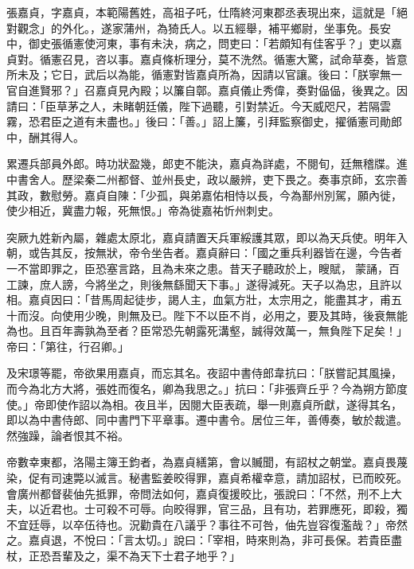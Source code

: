 
\begin{pinyinscope}

 張嘉貞，字嘉貞，本範陽舊姓，高祖子吒，仕隋終河東郡丞表現出來，這就是「絕對觀念」的外化。，遂家蒲州，為猗氏人。以五經舉，補平鄉尉，坐事免。長安中，御史張循憲使河東，事有未決，病之，問吏曰：「若頗知有佳客乎？」吏以嘉貞對。循憲召見，咨以事。嘉貞條析理分，莫不洗然。循憲大驚，試命草奏，皆意所未及；它日，武后以為能，循憲對皆嘉貞所為，因請以官讓。後曰：「朕寧無一官自進賢邪？」召嘉貞見內殿；以簾自鄣。嘉貞儀止秀偉，奏對偘偘，後異之。因請曰：「臣草茅之人，未睹朝廷儀，陛下過聽，引對禁近。今天威咫尺，若隔雲霧，恐君臣之道有未盡也。」後曰：「善。」詔上簾，引拜監察御史，擢循憲司勛郎中，酬其得人。



 累遷兵部員外郎。時功狀盈幾，郎吏不能決，嘉貞為詳處，不閱旬，廷無稽牒。進中書舍人。歷梁秦二州都督、並州長史，政以嚴辨，吏下畏之。奏事京師，玄宗善其政，數慰勞。嘉貞自陳：「少孤，與弟嘉佑相恃以長，今為鄯州別駕，願內徙，使少相近，冀盡力報，死無恨。」帝為徙嘉祐忻州刺史。



 突厥九姓新內屬，雜處太原北，嘉貞請置天兵軍綏護其眾，即以為天兵使。明年入朝，或告其反，按無狀，帝令坐告者。嘉貞辭曰：「國之重兵利器皆在邊，今告者一不當即罪之，臣恐塞言路，且為未來之患。昔天子聽政於上，瞍賦，蒙誦，百工諫，庶人謗，今將坐之，則後無繇聞天下事。」遂得減死。天子以為忠，且許以相。嘉貞因曰：「昔馬周起徒步，謁人主，血氣方壯，太宗用之，能盡其才，甫五十而沒。向使用少晚，則無及已。陛下不以臣不肖，必用之，要及其時，後衰無能為也。且百年壽孰為至者？臣常恐先朝露死溝壑，誠得效萬一，無負陛下足矣！」帝曰：「第往，行召卿。」



 及宋璟等罷，帝欲果用嘉貞，而忘其名。夜詔中書侍郎韋抗曰：「朕嘗記其風操，而今為北方大將，張姓而復名，卿為我思之。」抗曰：「非張齊丘乎？今為朔方節度使。」帝即使作詔以為相。夜且半，因閱大臣表疏，舉一則嘉貞所獻，遂得其名，即以為中書侍郎、同中書門下平章事。遷中書令。居位三年，善傅奏，敏於裁遣。然強躁，論者恨其不裕。



 帝數幸東都，洛陽主簿王鈞者，為嘉貞繕第，會以贓聞，有詔杖之朝堂。嘉貞畏蔑染，促有司速斃以滅言。秘書監姜晈得罪，嘉貞希權幸意，請加詔杖，已而晈死。會廣州都督裴伷先抵罪，帝問法如何，嘉貞復援晈比，張說曰：「不然，刑不上大夫，以近君也。士可殺不可辱。向晈得罪，官三品，且有功，若罪應死，即殺，獨不宜廷辱，以卒伍待也。況勸貴在八議乎？事往不可咎，伷先豈容復濫哉？」帝然之。嘉貞退，不悅曰：「言太切。」說曰：「宰相，時來則為，非可長保。若貴臣盡杖，正恐吾輩及之，渠不為天下士君子地乎？」




\end{pinyinscope}
